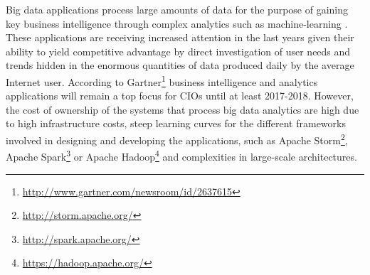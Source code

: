 
Big data applications process large amounts of data for the purpose of gaining key business intelligence through complex analytics such as machine-learning \cite{bdsurvey, ml4bd}. These applications are receiving increased attention in the last years given their ability to yield competitive advantage by direct investigation of user needs and trends hidden in the enormous quantities of data produced daily by the average Internet user. According to Gartner\footnote{\url{http://www.gartner.com/newsroom/id/2637615}} business intelligence and analytics applications will remain a top focus for CIOs until at least 2017-2018.
However, the cost of ownership of the systems that process big data analytics are high due to high infrastructure costs, steep learning curves for the different frameworks involved in designing and developing the applications, such as Apache Storm\footnote{\url{http://storm.apache.org/}}, Apache Spark\footnote{\url{http://spark.apache.org/}} or Apache Hadoop\footnote{\url{https://hadoop.apache.org/}} and complexities in large-scale architectures.

